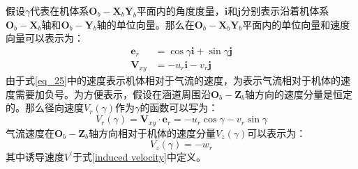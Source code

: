 假设$\gamma$代表在机体系${\boldsymbol{O}_b}-{\boldsymbol{X}_b}{\boldsymbol{Y}_b}$平面内的角度度量，$\boldsymbol{i}$和$\boldsymbol{j}$分别表示沿着机体系${\boldsymbol{O}_b}-{\boldsymbol{X}_b}$轴和${\boldsymbol{O}_b}-{\boldsymbol{Y}_b}轴$的单位向量。那么在${\boldsymbol{O}_b}-{\boldsymbol{X}_b}{\boldsymbol{Y}_b}$平面内的单位向量和速度向量可以表示为：
\begin{align}
    \boldsymbol{e}_{r}&=\cos\gamma\boldsymbol{i}+\sin\gamma\boldsymbol{j} \label{eq_24}\\
    \boldsymbol{V}_{xy}&=-u_r\boldsymbol{i}-v_r\boldsymbol{j} \label{eq_25}
\end{align}
由于式\eqref{eq_25}中的速度表示机体相对于气流的速度，为表示气流相对于机体的速度需要加负号。为方便表示，假设在涵道周围沿${\boldsymbol{O}_b}-{\boldsymbol{Z}_b}$轴方向的速度分量是恒定的。那么径向速度${V}_{r}(\gamma)$作为$\gamma$的函数可以写为：
\begin{equation}
    V_r(\gamma)=\boldsymbol{V}_{xy}\cdot{\boldsymbol{e}}_r=-u_r\cos\gamma-v_r\sin\gamma    \label{eq_26}
\end{equation}
气流速度在${\boldsymbol{O}_b}-{\boldsymbol{Z}_b}$轴方向相对于机体的速度分量$V_z(\gamma)$可以表示为：
\begin{equation}
    V_z(\gamma)=-w_r   \label{eq_27}
\end{equation}
其中诱导速度$V^{\prime}$于式\eqref{induced velocity}中定义。

